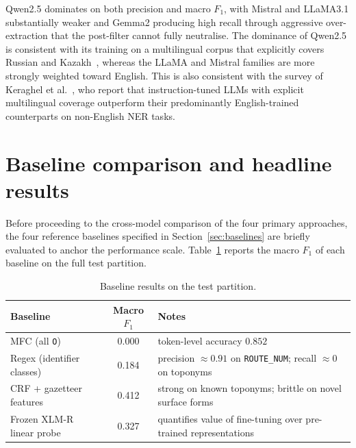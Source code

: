 Qwen2.5 dominates on both precision and macro $F_1$, with Mistral and LLaMA3.1 substantially weaker and Gemma2 producing high recall through aggressive over-extraction that the post-filter cannot fully neutralise. The dominance of Qwen2.5 is consistent with its training on a multilingual corpus that explicitly covers Russian and Kazakh~\cite{yang2024qwen}, whereas the LLaMA and Mistral families are more strongly weighted toward English. This is also consistent with the survey of Keraghel et al.~\cite{keraghel2024survey}, who report that instruction-tuned LLMs with explicit multilingual coverage outperform their predominantly English-trained counterparts on non-English NER tasks.


\section{Baseline comparison and headline results}
\label{sec:baselines_results}

Before proceeding to the cross-model comparison of the four primary approaches, the four reference baselines specified in Section~\ref{sec:baselines} are briefly evaluated to anchor the performance scale. Table~\ref{tab:baselines} reports the macro $F_1$ of each baseline on the full test partition.

\begin{table}[H]
\centering
\caption{Baseline results on the test partition.}
\label{tab:baselines}
\renewcommand{\arraystretch}{1.3}
\begin{tabular}{l c p{8cm}}
\toprule
\textbf{Baseline} & \textbf{Macro $F_1$} & \textbf{Notes} \\
\midrule
MFC (all \texttt{O})           & 0.000 & token-level accuracy $0.852$ \\
Regex (identifier classes)     & 0.184 & precision $\approx 0.91$ on \texttt{ROUTE\_NUM}; recall $\approx 0$ on toponyms \\
CRF + gazetteer features       & 0.412 & strong on known toponyms; brittle on novel surface forms \\
Frozen XLM-R linear probe      & 0.327 & quantifies value of fine-tuning over pre-trained representations \\
\bottomrule
\end{tabular}
\end{table}

